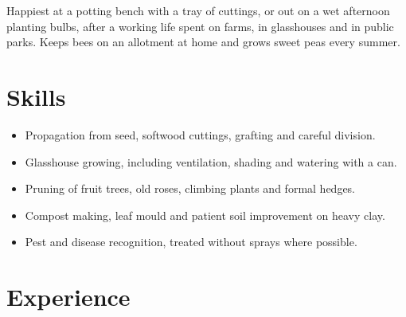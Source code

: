 \documentclass[11pt,a4paper,sans]{moderncv}
\begin{document}
\makecvtitle

\vspace{6pt}
\small{Happiest at a potting bench with a tray of cuttings, or out on a wet afternoon planting bulbs, after a working life spent on farms, in glasshouses and in public parks. Keeps bees on an allotment at home and grows sweet peas every summer.}

\section{Skills}
\vspace{1pt}
{\small
\begin{itemize}
    \item Propagation from seed, softwood cuttings, grafting and careful division.
    \item Glasshouse growing, including ventilation, shading and watering with a can.
    \item Pruning of fruit trees, old roses, climbing plants and formal hedges.
    \item Compost making, leaf mould and patient soil improvement on heavy clay.
    \item Pest and disease recognition, treated without sprays where possible.
\end{itemize}\par}
\addvspace{.5em}

\section{Experience}
\vspace{3pt}
\end{document}

